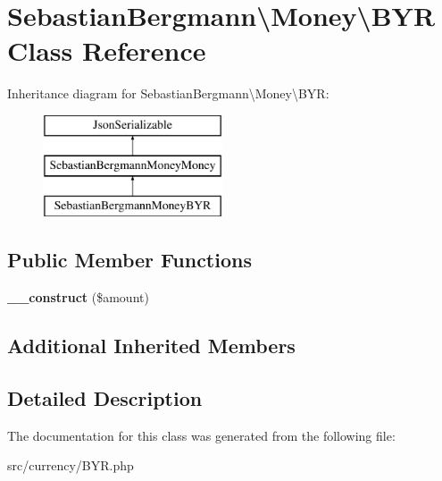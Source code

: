 \hypertarget{classSebastianBergmann_1_1Money_1_1BYR}{}\section{Sebastian\+Bergmann\textbackslash{}Money\textbackslash{}B\+Y\+R Class Reference}
\label{classSebastianBergmann_1_1Money_1_1BYR}
Inheritance diagram for Sebastian\+Bergmann\textbackslash{}Money\textbackslash{}B\+Y\+R\+:\begin{figure}[H]
\begin{center}
\leavevmode
\includegraphics[height=3.000000cm]{classSebastianBergmann_1_1Money_1_1BYR}
\end{center}
\end{figure}
\subsection*{Public Member Functions}
\begin{DoxyCompactItemize}
\item 
\hypertarget{classSebastianBergmann_1_1Money_1_1BYR_a00c7a027a35eff8b51f1f1058b5dbb60}{}{\bfseries \+\_\+\+\_\+construct} (\$amount)\label{classSebastianBergmann_1_1Money_1_1BYR_a00c7a027a35eff8b51f1f1058b5dbb60}

\end{DoxyCompactItemize}
\subsection*{Additional Inherited Members}


\subsection{Detailed Description}


The documentation for this class was generated from the following file\+:\begin{DoxyCompactItemize}
\item 
src/currency/B\+Y\+R.\+php\end{DoxyCompactItemize}
